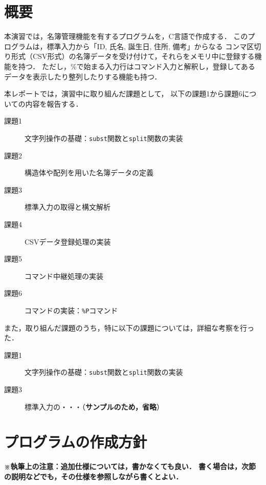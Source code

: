 \section{概要} \label{sec:1}

本演習では，名簿管理機能を有するプログラムを，C言語で作成する．
このプログラムは，標準入力から「ID, 氏名, 誕生日, 住所, 備考」からなる
コンマ区切り形式（CSV形式）の名簿データを受け付けて，それらをメモリ中に登録する機能を持つ．
ただし，\%で始まる入力行はコマンド入力と解釈し，登録してあるデータを表示したり整列したりする機能も持つ．

本レポートでは，演習中に取り組んだ課題として，
以下の課題1から課題6についての内容を報告する．
%
\begin{description}
  \item[課題1] 文字列操作の基礎：\verb|subst|関数と\verb|split|関数の実装
  \item[課題2] 構造体や配列を用いた名簿データの定義
  \item[課題3] 標準入力の取得と構文解析
  \item[課題4] CSVデータ登録処理の実装
  \item[課題5] コマンド中継処理の実装
  \item[課題6] コマンドの実装：\verb|%P|コマンド
\end{description}
%
また，取り組んだ課題のうち，特に以下の課題については，詳細な考察を行った．
%
\begin{description}
  \item[課題1] 文字列操作の基礎：\verb|subst|関数と\verb|split|関数の実装
  \item[課題3] 標準入力の・・・（\textbf{サンプルのため，省略}）
\end{description}


\section{プログラムの作成方針} \label{sec:2}
\textbf{\small※執筆上の注意：追加仕様については，書かなくても良い．
    書く場合は，次節の説明などでも，その仕様を参照しながら書くとよい．\\}

